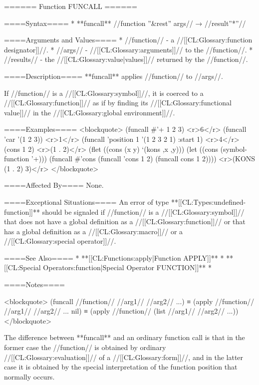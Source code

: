 ====== Function FUNCALL ======

====Syntax====
  *  **funcall** //function ''&rest'' args// → //result''*''//

====Arguments and Values====
  * //function// - a //[[CL:Glossary:function designator]]//.
  * //args// - //[[CL:Glossary:arguments]]// to the //function//.
  * //results// - the //[[CL:Glossary:value|values]]// returned by the //function//.

====Description====
**funcall** applies //function// to //args//.

If //function// is a //[[CL:Glossary:symbol]]//, it is coerced to a //[[CL:Glossary:function]]// as if by finding its //[[CL:Glossary:functional value]]// in the //[[CL:Glossary:global environment]]//.

====Examples====
<blockquote>
(funcall #'+ 1 2 3) <r>6</r>
(funcall 'car '(1 2 3)) <r>1</r>
(funcall 'position 1 '(1 2 3 2 1) :start 1) <r>4</r>
(cons 1 2) <r>(1 . 2)</r>
(flet ((cons (x y) `(kons ,x ,y)))
  (let ((cons (symbol-function '+)))
    (funcall #'cons (funcall 'cons 1 2) (funcall cons 1 2)))) <r>(KONS (1 . 2) 3)</r>
</blockquote>

====Affected By====
None.

====Exceptional Situations====
An error of type **[[CL:Types:undefined-function]]** should be signaled if //function// is a //[[CL:Glossary:symbol]]// that does not have a global definition as a //[[CL:Glossary:function]]// or that has a global definition as a //[[CL:Glossary:macro]]// or a //[[CL:Glossary:special operator]]//.

====See Also====
  * **[[CL:Functions:apply|Function APPLY]]**
  * **[[CL:Special Operators:function|Special Operator FUNCTION]]**
  * {\secref\Evaluation}

====Notes====

<blockquote>
(funcall //function// //arg1// //arg2// ...) 
  ≡ (apply //function// //arg1// //arg2// ... nil) 
  ≡ (apply //function// (list //arg1// //arg2// ...))
</blockquote>

The difference between **funcall** and an ordinary function call is that in the former case the //function// is obtained by ordinary //[[CL:Glossary:evaluation]]// of a //[[CL:Glossary:form]]//, and in the latter case it is obtained by the special interpretation of the function position that normally occurs.

